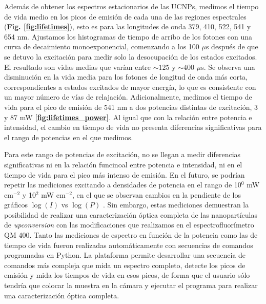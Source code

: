 Además de obtener los espectros estacionarios de las UCNPs, medimos el tiempo de vida medio en los picos de emisión de cada una de las regiones espectrales (\textbf{Fig. \ref{fig:lifetimes}}), esto es para las longitudes de onda 379, 410, 522, 541 y 654 nm.
Ajustamos los histogramas de tiempo de arribo de los fotones con una curva de decaimiento monoexponencial, comenzando a los 100 $\mu$s después de que se detuvo la excitación para medir solo la desocupación de los estados excitados.  
El resultado son vidas medias que varían entre $\sim125$ y $\sim400$ $\mu$s.  
Se observa una disminución en la vida media para los fotones de longitud de onda más corta, correspondientes a estados excitados de mayor energía, lo que es consistente con un mayor número de vías de relajación. 
Adicionalmente, medimos el tiempo de vida para el pico de emisión de 541 nm a dos potencias distintas de excitación, 3 y 87 mW \textbf{\ref{fig:lifetimes_power}}.
Al igual que con la relación entre potencia e intensidad, el cambio en tiempo de vida no presenta diferencias significativas para el rango de potencias en el que medimos.

Para este rango de potencias de excitación, no se llegan a medir diferencias significativas ni en la relación funcinoal entre potencia e intensidad, ni en el tiempo de vida para el pico más intenso de emisión.
En el futuro, se podrían repetir las mediciones excitando a densidades de potencia en el rango de 10$^0$ mW cm$^{-2}$ y 10$^2$ mW cm$^{-2}$, en el que se observan cambios en la pendiente de los gráficos $\log(I)$ vs $\log(P)$ \cite{bujjamer_luminescent_2020}.
Sin embargo, estas mediciones demuestran la posibilidad de realizar una caracterización óptica completa de las nanopartículas de \textit{upconversion} con las modificaciones que realizamos en el espectrofluorímetro QM 400.
Tanto las mediciones de espectro en función de la potencia como las de tiempo de vida fueron realizadas automáticamente con secuencias de comandos programadas en Python.
La plataforma permite desarrollar una secuencia de comandos más compleja que mida un espectro completo, detecte los picos de emisión y mida los tiempos de vida en esos picos, de forma que el usuario sólo tendría que colocar la muestra en la cámara y ejecutar el programa para realizar una caracterización óptica completa.




